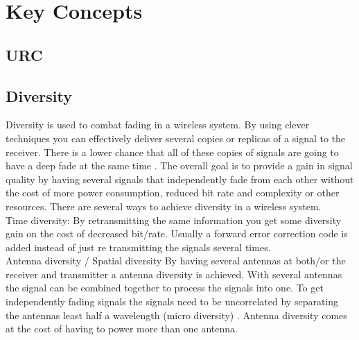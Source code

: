 \chapter{Key Concepts}
\section{URC}


\section{Diversity}
Diversity is used to combat fading in a wireless system. By using clever techniques you can effectively deliver several copies or replicas of a signal to the receiver. There is a lower chance that all of these copies of signals are going to have a deep fade at the same time \citep[p. 4-6]{diversityFuture}. The overall goal is to provide a gain in signal quality by having several signals that independently fade from each other without the cost of more power consumption, reduced bit rate and complexity or other resources. There are several ways to achieve diversity in a wireless system. \\
Time diversity: By retransmitting the same information you get some diversity gain on the cost of decreased bit/rate. Usually a forward error correction code is added instead of just re transmitting the signals several times. \\
Antenna diversity / Spatial diversity
By having several antennas at both/or the receiver and transmitter a antenna diversity is achieved. With several antennas the signal can be combined together to process the signals into one. To get independently fading signals the signals need to be uncorrelated by separating the antennas least half a wavelength (micro diversity) \citep{diversityAntenna}. Antenna diversity comes at the cost of having to power more than one antenna.


